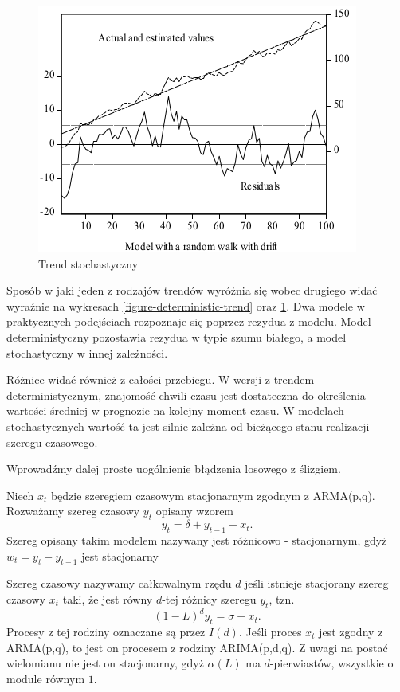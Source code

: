 \documentclass[10pt,a4paper]{book}
\begin{document}
\begin{figure}
\centering
\includegraphics[scale=1]{images/stochastic_trend_residuas.png}
\caption{Trend stochastyczny}
\label{figure-stochastic-trend}
\end{figure}

Sposób w jaki jeden z rodzajów trendów wyróżnia się wobec drugiego widać wyraźnie na wykresach
\ref{figure-deterministic-trend} oraz \ref{figure-stochastic-trend}. Dwa modele w praktycznych podejściach rozpoznaje się poprzez rezydua z modelu. Model deterministyczny pozostawia rezydua w typie szumu białego, a model stochastyczny w innej zależności.

Różnice widać również z całości przebiegu. W wersji z trendem deterministycznym, znajomość chwili czasu jest dostateczna do określenia wartości średniej w prognozie na kolejny moment czasu. W modelach stochastycznych wartość ta jest silnie zależna od bieżącego stanu realizacji szeregu czasowego.

Wprowadźmy dalej proste uogólnienie błądzenia losowego z ślizgiem. 

\begin{remark}
Niech $x_t$ będzie szeregiem czasowym stacjonarnym zgodnym z ARMA(p,q). Rozważamy szereg czasowy $y_t$ opisany wzorem
$$
y_t = \delta + y_{t-1} + x_t.
$$
Szereg opisany takim modelem nazywany jest różnicowo - stacjonarnym, gdyż $w_t = y_t - y_{t-1}$ jest stacjonarny
\end{remark}

\begin{definition}
Szereg czasowy nazywamy całkowalnym rzędu $d$ jeśli istnieje stacjorany szereg czasowy $x_t$ taki, że jest równy $d$-tej różnicy szeregu $y_t$, tzn.
$$
(1-L)^d y_t = \sigma + x_t.
$$
Procesy z tej rodziny oznaczane są przez $I(d)$. Jeśli proces $x_t$ jest zgodny z ARMA(p,q), to jest on procesem z rodziny ARIMA(p,d,q). Z uwagi na postać wielomianu nie jest on stacjonarny, gdyż $\alpha(L)$ ma $d$-pierwiastów, wszystkie o module równym $1$.  
\end{definition}
\end{document}
